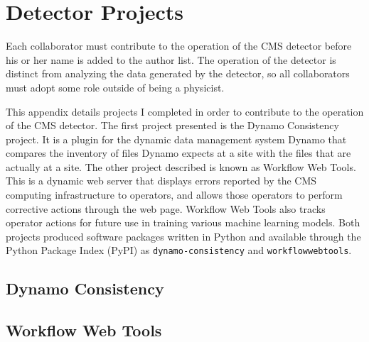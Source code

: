 \chapter{Detector Projects} \label{app:project}

Each collaborator must contribute to the operation of the CMS detector before his or her name is added to the author list.
The operation of the detector is distinct from analyzing the data generated by the detector, so all collaborators must adopt some role outside of being a physicist.

This appendix details projects I completed in order to contribute to the operation of the CMS detector.
The first project presented is the Dynamo Consistency project.
It is a plugin for the dynamic data management system Dynamo \cite{iiyama2020dynamo} that compares the inventory of files Dynamo expects at a site with the files that are actually at a site.
The other project described is known as Workflow Web Tools.
This is a dynamic web server that displays errors reported by the CMS computing infrastructure to operators, and allows those operators to perform corrective actions through the web page.
Workflow Web Tools also tracks operator actions for future use in training various machine learning models.
Both projects produced software packages written in Python \cite{van1995python, 10.5555/1593511} and available through the Python Package Index (PyPI) as \texttt{dynamo-consistency} and \texttt{workflowwebtools}.


\section{Dynamo Consistency}

\cite{dorigo2005xrootd} \cite{laure2006programming}


\section{Workflow Web Tools}

